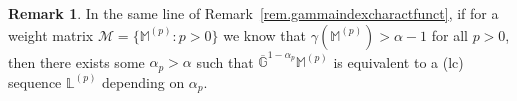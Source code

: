 \documentclass[11pt,a4paper]{article}
\theoremstyle{plain}
\theoremstyle{definition}
\newtheorem{example}[proposition]{Example}
\newtheorem{remark}[proposition]{Remark}
\newcommand{\M}{\mathbb{M}}
\newcommand{\LL}{\mathbb{L}}
\newcommand{\G}{\mathbb{G}}
\begin{document}


\begin{remark}\label{ramimatrixdc.}
In the same line of Remark~\ref{rem.gammaindexcharactfunct}, if for a weight matrix $\mathcal{M}=\{\M^{(p)}: p>0\}$  we know that $\gamma(\M^{(p)})>\alpha-1$ for all $p>0$, then there exist{s} some $\alpha_p>\alpha$ such that $\overline{\G}^{1-\alpha_p}\M^{(p)}$ is equivalent to a (lc) sequence $\LL^{(p)}$ depending on $\alpha_p$.
\end{remark}

\end{document}

